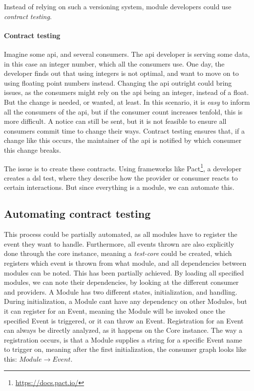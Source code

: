 Instead of relying on such a versioning system, module developers could use
\textit{contract testing}.

\paragraph{Contract testing} Imagine some \gls*{api}, and several consumers.
The \gls*{api} developer is serving some data, in this case an integer number,
which all the consumers use. One day, the developer finds out that using
integers is not optimal, and want to move on to using floating point numbers
instead. Changing the \gls*{api} outright could bring issues, as the consumers
might rely on the \gls*{api} being an integer, instead of a float. But the
change is needed, or wanted, at least. In this scenario, it is \textit{easy} to
inform all the consumers of the \gls*{api}, but if the consumer count increases
tenfold, this is more difficult. A notice can still be sent, but it is not
feasible to ensure all consumers commit time to change their ways. Contract
testing ensures that, if a change like this occurs, the maintainer of the
\gls*{api} is notified by which consumer this change breaks.

The issue is to create these contracts. Using frameworks like Pact\footnote{\url{https://docs.pact.io/}},
a developer creates a \gls*{dsl} test, where they describe how the provider or
consumer reacts to certain interactions. But since everything is a module, we
can automate this.

\subsection{Automating contract testing}

This process could be partially automated, as all modules have to register the
event they want to handle. Furthermore, all events thrown are also explicitly
done through the core instance, meaning a \textit{test-core} could be created,
which registers which event is thrown from what module, and all dependencies
between modules can be noted. This has been partially achieved. By loading all
specified modules, we can note their dependencies, by looking at the different
consumer and providers. A Module has two different states, initialization, and
handling. During initialization, a Module cant have any dependency on other
Modules, but it can register for an Event, meaning the Module will be invoked
once the specified Event is triggered, or it can throw an Event. Registration
for an Event can always be directly analyzed, as it happens on the Core
instance. The way a registration occurs, is that a Module supplies a string for
a specific Event name to trigger on, meaning after the first initialization, the
consumer graph looks like this: $Module \to Event$.

